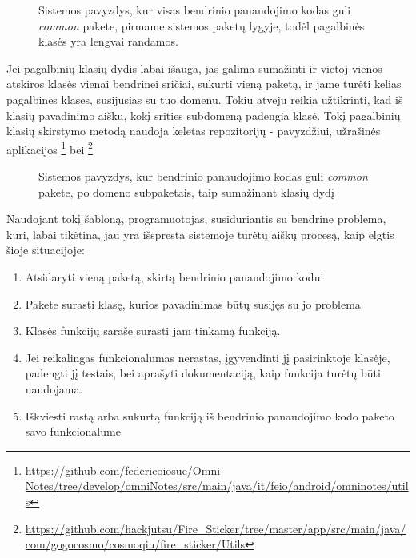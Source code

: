 \begin{figure}[H]
\snugshade
{}
\endsnugshade
\caption{Sistemos pavyzdys, kur visas bendrinio panaudojimo kodas guli \textit{common} pakete, pirmame sistemos paketų lygyje, todėl
pagalbinės klasės yra lengvai randamos.}
\end{figure}

Jei pagalbinių klasių dydis labai išauga, jas galima sumažinti ir vietoj vienos atskiros klasės vienai bendrinei sričiai, sukurti vieną paketą,
ir jame turėti kelias pagalbines klases, susijusias su tuo domenu.
Tokiu atveju reikia užtikrinti, kad iš klasių pavadinimo aišku, kokį srities subdomeną padengia klasė.
Tokį pagalbinių klasių skirstymo metodą naudoja keletas repozitorijų - pavyzdžiui, užrašinės aplikacijos  \footnote{\url{https://github.com/federicoiosue/Omni-Notes/tree/develop/omniNotes/src/main/java/it/feio/android/omninotes/utils}} bei
\footnote{\url{https://github.com/hackjutsu/Fire_Sticker/tree/master/app/src/main/java/com/gogocosmo/cosmoqiu/fire_sticker/Utils}}

\begin{figure}[H]
\snugshade
{}
\endsnugshade
\caption{Sistemos pavyzdys, kur bendrinio panaudojimo kodas guli \textit{common} pakete, po domeno subpaketais, taip sumažinant klasių dydį }
\end{figure}

Naudojant tokį šabloną, programuotojas, susiduriantis su bendrine problema, kuri, labai tikėtina, jau yra išspresta sistemoje turėtų
aiškų procesą, kaip elgtis šioje situacijoje:
\begin{enumerate}
    \item Atsidaryti vieną paketą, skirtą bendrinio panaudojimo kodui
    \item Pakete surasti klasę, kurios pavadinimas būtų susijęs su jo problema
    \item Klasės funkcijų saraše surasti jam tinkamą funkciją.
    \item Jei reikalingas funkcionalumas nerastas, įgyvendinti jį pasirinktoje klasėje, padengti jį testais,
    bei aprašyti dokumentaciją, kaip funkcija turėtų būti naudojama.
    \item Iškviesti rastą arba sukurtą funkciją iš bendrinio panaudojimo kodo paketo savo funkcionalume
\end{enumerate}

